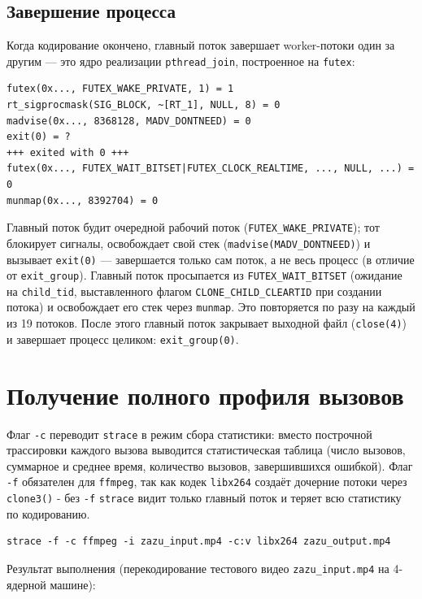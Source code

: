 \documentclass[12pt,a4paper]{article}
\begin{document}
\subsection{Завершение процесса}
Когда кодирование окончено, главный поток завершает worker-потоки один за
другим — это ядро реализации \texttt{pthread\_join}, построенное на \texttt{futex}:
\begin{lstlisting}
futex(0x..., FUTEX_WAKE_PRIVATE, 1) = 1
rt_sigprocmask(SIG_BLOCK, ~[RT_1], NULL, 8) = 0
madvise(0x..., 8368128, MADV_DONTNEED) = 0
exit(0) = ?
+++ exited with 0 +++
futex(0x..., FUTEX_WAIT_BITSET|FUTEX_CLOCK_REALTIME, ..., NULL, ...) = 0
munmap(0x..., 8392704) = 0
\end{lstlisting}
Главный поток будит очередной рабочий поток (\texttt{FUTEX\_WAKE\_PRIVATE});
тот блокирует сигналы, освобождает свой стек (\texttt{madvise(MADV\_DONTNEED)})
и вызывает \texttt{exit(0)} — завершается только сам поток, а не весь процесс
(в отличие от \texttt{exit\_group}). Главный поток просыпается из
\texttt{FUTEX\_WAIT\_BITSET} (ожидание на \texttt{child\_tid}, выставленного
флагом \texttt{CLONE\_CHILD\_CLEARTID} при создании потока) и освобождает его
стек через \texttt{munmap}. Это повторяется по разу на каждый из 19 потоков.
После этого главный поток закрывает выходной файл
(\texttt{close(4)}) и завершает процесс целиком: \texttt{exit\_group(0)}.

\section{Получение полного профиля вызовов}

Флаг \texttt{-c} переводит \texttt{strace} в режим сбора статистики: вместо построчной
трассировки каждого вызова выводится статистическая таблица (число вызовов,
суммарное и среднее время, количество вызовов, завершившихся ошибкой). Флаг \texttt{-f}
обязателен для \texttt{ffmpeg}, так как кодек \texttt{libx264} создаёт дочерние потоки
через \texttt{clone3()} - без \texttt{-f} \texttt{strace} видит только главный поток и
теряет всю статистику по кодированию.

\begin{lstlisting}
strace -f -c ffmpeg -i zazu_input.mp4 -c:v libx264 zazu_output.mp4
\end{lstlisting}

Результат выполнения (перекодирование тестового видео \texttt{zazu\_input.mp4} на
4-ядерной машине):
\end{document}
